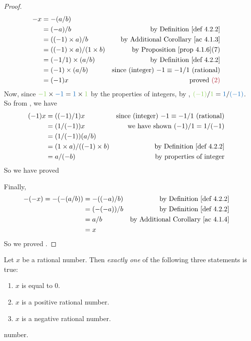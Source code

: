 \begin{proof}
\begin{align*}
    -x & = -(a / b) \\
       & = (-a) / b & \text{by \DEF{4.2.2}} \\
       & = ((-1) \X a) / b & \text{by \AC{4.1.3}} \\
       & = ((-1) \X a) / (1 \X b) & \text{by \PROP{4.1.6}(7)} \\
       & = (-1 / 1) \X (a / b) & \text{by \DEF{4.2.2}} \\
       & = (-1) \X (a / b) & \text{since (integer) \(-1 \equiv -1 / 1\) (rational)} \\
       & = (-1)x & \text{proved \MAROON{(2)}}
\end{align*}
Now, since \(\GREEN{-1} \X \BLUE{-1} = \BLUE{1} \X \GREEN{1}\) by the properties of integers, by , \(\GREEN{(-1)} / \GREEN{1} = \BLUE{1} / \BLUE{(-1)}\).
So from , we have
\begin{align*}
        (-1)x
    & = ((-1) / 1)x & \text{since (integer) \(-1 \equiv -1 / 1\) (rational)} \\
    & = (1 / (-1))x & \text{we have shown \((-1)/1 = 1/(-1)\)} \\
    & = (1 / (-1))(a/b) \\
    & = (1 \X a)/((-1) \X b) & \text{by \DEF{4.2.2}} \\
    & = a/(-b) & \text{by properties of integer}
\end{align*}
So we have proved 

Finally,
\begin{align*}
    -(-x) = -(-(a / b))
        & = -((-a) / b) & \text{by \DEF{4.2.2}} \\
        & = (-(-a)) / b & \text{by \DEF{4.2.2}} \\
        & = a / b & \text{by \AC{4.1.4}} \\
        & = x
\end{align*}
So we proved .
\end{proof}

\begin{lemma}  \label{lem 4.2.7}
Let \(x\) be a rational number.
Then \emph{exactly one} of the following three statements is true:
\begin{enumerate}
    \item \(x\) is equal to \(0\).
    \item \(x\) is a positive rational number.
    \item \(x\) is a negative rational number.
\end{enumerate}
number.
\end{lemma}

